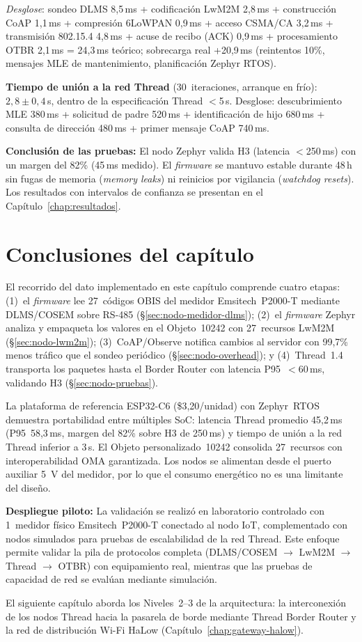 \emph{Desglose}: sondeo DLMS 8,5\,ms + codificación LwM2M 2,8\,ms + construcción CoAP 1,1\,ms + compresión 6LoWPAN 0,9\,ms + acceso CSMA/CA 3,2\,ms + transmisión 802.15.4 4,8\,ms + acuse de recibo (ACK) 0,9\,ms + procesamiento OTBR 2,1\,ms = 24,3\,ms teórico; sobrecarga real +20,9\,ms (reintentos 10\%, mensajes MLE de mantenimiento, planificación Zephyr RTOS).

\textbf{Tiempo de unión a la red Thread} (30~iteraciones, arranque en frío): $2{,}8 \pm 0{,}4$\,s, dentro de la especificación Thread $<$5\,s. Desglose: descubrimiento MLE 380\,ms + solicitud de padre 520\,ms + identificación de hijo 680\,ms + consulta de dirección 480\,ms + primer mensaje CoAP 740\,ms.

\textbf{Conclusión de las pruebas:} El nodo Zephyr valida H3 (latencia $<$250\,ms) con un margen del 82\% (45\,ms medido). El \emph{firmware} se mantuvo estable durante 48\,h sin fugas de memoria (\emph{memory leaks}) ni reinicios por vigilancia (\emph{watchdog resets}). Los resultados con intervalos de confianza se presentan en el Capítulo~\ref{chap:resultados}.


\section{Conclusiones del capítulo}
\label{sec:nodo-conclusiones}

El recorrido del dato implementado en este capítulo comprende cuatro etapas: (1)~el \emph{firmware} lee 27~códigos OBIS del medidor Emsitech~P2000-T mediante DLMS/COSEM sobre RS-485 (§\ref{sec:nodo-medidor-dlms}); (2)~el \emph{firmware} Zephyr analiza y empaqueta los valores en el Objeto~10242 con 27~recursos LwM2M (§\ref{sec:nodo-lwm2m}); (3)~CoAP/Observe notifica cambios al servidor con 99,7\% menos tráfico que el sondeo periódico (§\ref{sec:nodo-overhead}); y (4)~Thread~1.4 transporta los paquetes hasta el Border Router con latencia P95~$<$60\,ms, validando H3 (§\ref{sec:nodo-pruebas}).

La plataforma de referencia ESP32-C6 (\$3,20/unidad) con Zephyr~RTOS demuestra portabilidad entre múltiples SoC: latencia Thread promedio 45,2\,ms (P95~58,3\,ms, margen del 82\% sobre H3 de 250\,ms) y tiempo de unión a la red Thread inferior a 3\,s. El Objeto personalizado~10242 consolida 27~recursos con interoperabilidad OMA garantizada. Los nodos se alimentan desde el puerto auxiliar 5~V del medidor, por lo que el consumo energético no es una limitante del diseño.

\textbf{Despliegue piloto:} La validación se realizó en laboratorio controlado con 1~medidor físico Emsitech~P2000-T conectado al nodo IoT, complementado con nodos simulados para pruebas de escalabilidad de la red Thread. Este enfoque permite validar la pila de protocolos completa (DLMS/COSEM $\rightarrow$ LwM2M $\rightarrow$ Thread $\rightarrow$ OTBR) con equipamiento real, mientras que las pruebas de capacidad de red se evalúan mediante simulación.

El siguiente capítulo aborda los Niveles~2--3 de la arquitectura: la interconexión de los nodos Thread hacia la pasarela de borde mediante Thread Border Router y la red de distribución Wi-Fi HaLow (Capítulo~\ref{chap:gateway-halow}).
